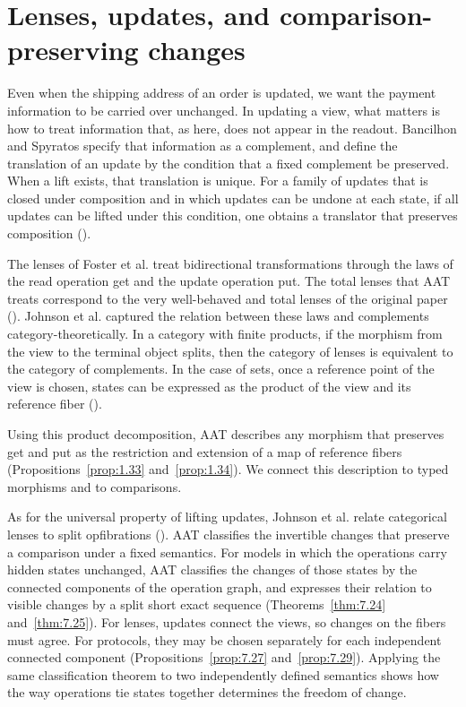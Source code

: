 \section{Lenses, updates, and comparison-preserving changes}\label{sec:R.5}

Even when the shipping address of an order is updated, we want the payment information to be
carried over unchanged. In updating a view, what matters is how to treat information that,
as here, does not appear in the readout.
Bancilhon and Spyratos specify that information as a complement, and define the translation
of an update by the condition that a fixed complement be preserved.
When a lift exists, that translation is unique.
For a family of updates that is closed under composition and in which updates can be undone
at each state, if all updates can be lifted under this condition, one obtains a translator
that preserves composition
(\cite[\href{https://www.inf.unibz.it/franconispace/lib/exe/fetch.php?media=organisation\%3Asakt\%3A2013\%3A5.pdf}{\S\S3, 5, 7, Theorems 5.6, 7.1}]{BS81}).

The lenses of Foster et al. treat bidirectional transformations through the laws of the read
operation get and the update operation put. The total lenses that AAT treats correspond to the very
well-behaved and total lenses of the original paper
(\cite[\href{https://www.cis.upenn.edu/~bcpierce/papers/newlenses-full.pdf}{\S3.1, Definitions 3.1.2--3.1.3, PutPut}]{FGMPS04}).
Johnson et al. captured the relation between these laws and complements
category-theoretically. In a category with finite products, if the morphism from the view to
the terminal object splits, then the category of lenses is equivalent to the category of
complements. In the case of sets, once a reference point of the view is chosen, states can
be expressed as the product of the view and its reference fiber
(\cite[\href{https://mta.ca/~rrosebru/articles/Lens2Cambridge.pdf}{\S3, Propositions 3.1--3.2}]{JRW12}).

Using this product decomposition, AAT describes any morphism that preserves get and put as
the restriction and extension of a map of reference fibers
(Propositions~\ref{prop:1.33} and~\ref{prop:1.34}).
We connect this description to typed morphisms and to comparisons.

As for the universal property of lifting updates, Johnson et al. relate categorical lenses
to split opfibrations
(\cite[\href{https://mta.ca/~rrosebru/articles/Lens2Cambridge.pdf}{\S4, Remark 4.1, Corollary 4.1, Proposition 4.3}]{JRW12}).
AAT classifies the invertible changes that preserve a comparison under a fixed semantics.
For models in which the operations carry hidden states unchanged, AAT classifies the changes
of those states by the connected components of the operation graph, and expresses their
relation to visible changes by a split short exact sequence
(Theorems~\ref{thm:7.24} and~\ref{thm:7.25}).
For lenses, updates connect the views, so changes on the fibers must agree.
For protocols, they may be chosen separately for each independent connected component
(Propositions~\ref{prop:7.27} and~\ref{prop:7.29}).
Applying the same classification theorem to two independently defined semantics
shows how the way operations tie states together determines the freedom of change.

